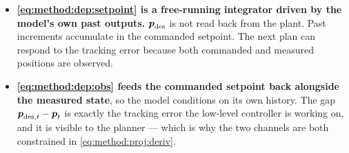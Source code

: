 \begin{itemize}
  \item \textbf{\eqref{eq:method:dep:setpoint} is a free-running integrator driven by the model's own
    past outputs.} $\boldsymbol{p}_{\textrm{des}}$ is not read back from the plant. Past increments accumulate in the commanded setpoint. The next plan can respond to the
    tracking error because both commanded and measured positions are observed.
  \item \textbf{\eqref{eq:method:dep:obs} feeds the commanded setpoint back alongside the measured
    state}, so the model conditions on its own history. The gap
    $\boldsymbol{p}_{\textrm{des},t} - \boldsymbol{p}_{t}$ is exactly the tracking error the low-level controller is
    working on, and it is visible to the planner --- which is why the two channels are both
    constrained in \eqref{eq:method:proj:deriv}.
\end{itemize}

